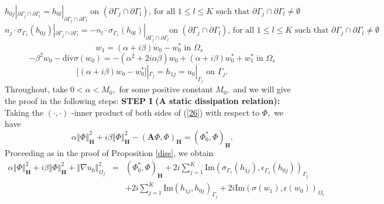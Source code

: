 \documentclass[11pt]{article}
\begin{document}
\begin{equation}
h_{0j}|_{\partial \Gamma _{j}\cap \partial \Gamma _{l}}=h_{0l}|_{\partial
\Gamma _{j}\cap \partial \Gamma _{l}}\text{ on \ }(\partial \Gamma _{j}\cap
\partial \Gamma _{l})\text{, for all }1\leq l\leq K\text{ such that }%
\partial \Gamma _{j}\cap \partial \Gamma _{l}\neq \emptyset   \label{27.d}
\end{equation}%
\begin{equation}
n_{j}\cdot \sigma _{\Gamma _{s}}(h_{0j})|_{\partial \Gamma _{j}\cap \partial
\Gamma _{l}}=-n_{l}\cdot \sigma _{\Gamma _{s}}(h_{0l})|_{\partial \Gamma
_{j}\cap \partial \Gamma _{l}}\text{on }(\partial \Gamma _{j}\cap \partial
\Gamma _{l}) \text{, for all }1\leq l\leq K\text{ such that }\partial \Gamma
_{j}\cap \partial \Gamma _{l}\neq \emptyset   \label{27.e}
\end{equation}%
\begin{equation}
w_{1}=(\alpha +i\beta )w_{0}-w_{0}^{\ast }\text{ \ in }\Omega _{s}\text{\ }
\label{27.f}
\end{equation}%
\begin{equation}
-\beta ^{2}w_{0}-\text{div}\sigma (w_{0})=-(\alpha ^{2}+2i\alpha \beta
)w_{0}+(\alpha +i\beta )w_{0}^{\ast }+w_{1}^{\ast }\text{ \ \ in }\Omega _{s}
\label{27.g}
\end{equation}%
\begin{equation}
\lbrack (\alpha +i\beta )w_{0}-w_{0}^{\ast }]|_{\Gamma
_{j}}=h_{1j}=u_{0}|_{\Gamma _{j}}\text{ \ on \ }\Gamma _{j}.  \label{27.h}
\end{equation}%
Throughout, take $0<\alpha<M_0,$ for some positive constant $M_0,$ and we will give the proof in the following steps: \newline \newline
\textbf{STEP I }\textbf{(A static dissipation relation):} Taking the $(\cdot ,\cdot )$%
-inner product of both sides of (\ref{26}) with respect to $\Phi ,$ we have%
\[
\alpha \left\Vert \Phi \right\Vert _{\mathbf{H}}^{2}+i\beta \left\Vert \Phi
\right\Vert _{\mathbf{H}}^{2}-(\mathbf{A}\Phi ,\Phi )_{\mathbf{H}}=(\Phi _{0}^{\ast },\Phi )_{\mathbf{H}}.
\]
Proceeding as in the proof of Proposition \ref{diss}, we obtain%
\begin{eqnarray*}
\alpha \left\Vert \Phi \right\Vert _{\mathbf{H}}^{2}+i\beta \left\Vert \Phi
\right\Vert _{\mathbf{H}}^{2}+\left\Vert \nabla u_{0}\right\Vert _{\Omega
_{f}}^{2}&=&(\Phi
_{0}^{\ast },\Phi )_{\mathbf{H}}+2i\sum\limits_{j=1}^{K}\text{Im}(\sigma _{\Gamma
_{s}}(h_{1j}),\epsilon _{\Gamma _{s}}({h}_{0j}))_{\Gamma
_{j}}\\
&&+2i\sum\limits_{j=1}^{K}\text{Im}(h_{1j},{h}_{0j})_{\Gamma _{j}}+2i\text{Im}(
\sigma(w_{1}),\epsilon({w}_{0}))_{\Omega _{s}}\end{eqnarray*}%
\end{document}
